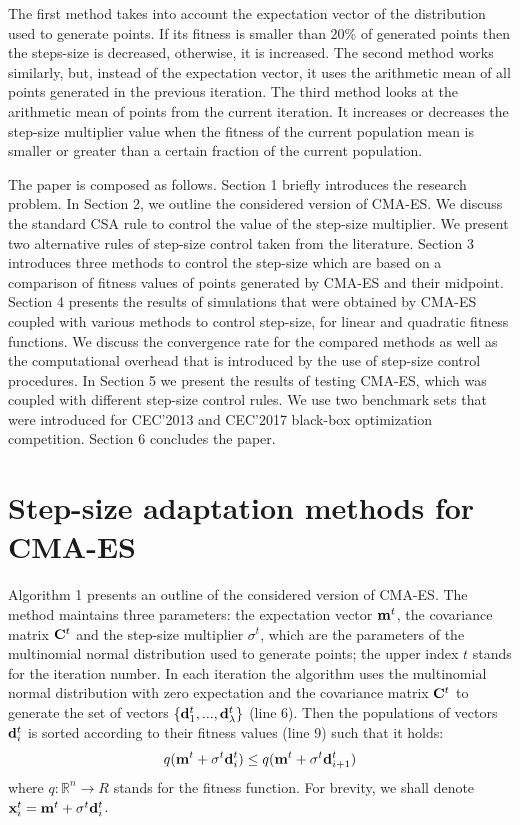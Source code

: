 \documentclass[runningheads,a4paper]{llncs}
\newcommand{\wek}[1]{
    {\bf #1} 
}
\newcommand{\mat}[1]{
    {\bf #1} 
}
\begin{document}
The first method takes into account the expectation vector of the distribution used to generate points. If its fitness is smaller than 20\% of generated points then the steps-size is decreased, otherwise, it is increased. The second method works similarly, but, instead of the expectation vector, it uses the arithmetic mean of all points generated in the previous iteration. The third method looks at the arithmetic mean of points from the current iteration. It increases or decreases the step-size multiplier value when the fitness of the current population mean is smaller or greater than a certain fraction of the current population.

The paper is composed as follows. Section 1 briefly introduces the research problem. In Section 2, we outline the considered version of CMA-ES. We discuss the standard CSA rule to control the value of the step-size multiplier. We present two alternative rules of step-size control taken from the literature. Section 3 introduces three methods to control the step-size which are based on a comparison of fitness values of points generated by CMA-ES and their midpoint. Section 4 presents the results of simulations that were obtained by CMA-ES coupled with various methods to control step-size, for linear and quadratic fitness functions. We discuss the convergence rate for the compared methods as well as the computational overhead that is introduced by the use of step-size control procedures.  In Section 5 we present the results of testing CMA-ES, which was coupled with different step-size control rules. We use two benchmark sets that were introduced for CEC'2013 and CEC'2017 black-box optimization competition. Section 6 concludes the paper. 


\section{Step-size adaptation methods for CMA-ES}

Algorithm 1 presents an outline of the considered version of CMA-ES. The method maintains three parameters: the expectation vector $\wek{m}^t$, the covariance matrix $\mat{C}^t$ and the step-size multiplier $\sigma^t$, which are the parameters of the multinomial normal distribution used to generate points; the upper index $t$ stands for the iteration number.
In each iteration the algorithm uses the multinomial normal distribution with zero expectation and the covariance matrix $\mat{C}^t$ to generate the set of vectors $\{\wek{d}_1^t,...,\wek{d}_\lambda^t\}$ (line 6).%
Then the populations of vectors $\wek{d}_i^t$ is sorted according to their fitness values (line 9) such that it holds:
\begin{equation*}
q(\wek{m}^t+\sigma^t \wek{d}_i^t) \leq q(\wek{m}^t+\sigma^t \wek{d}_{i+1}^t)
\end{equation*}
where $q: {\mathbb R}^n \rightarrow R$ stands for the fitness function.
For brevity, we shall denote $\wek{x}^t_i=\wek{m}^t+\sigma^t \wek{d}_i^t$.
\end{document}
